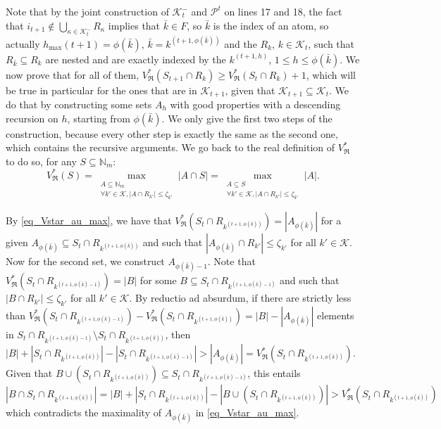 \documentclass[
  11pt,
  a4paper,
]{article}
\theoremstyle{plain}
\theoremstyle{definition}
\theoremstyle{plain}
\theoremstyle{definition}
\theoremstyle{plain}
\theoremstyle{remark}
\begin{document}
Note that by the joint construction of \(\mathcal{K}^-_t\) and
\(\mathcal{P}^t\) on lines 17 and 18, the fact that
\(i_{t+1}\not\in\bigcup_{\kappa\in\mathcal{K}^-_{t}}R_{\kappa}\) implies
that \(\bar k\in F\), so \(\bar k\) is the index of an atom, so actually
\(h_{\max}(t+1)=\phi(\bar k)\), \(\bar k = k^{(t+1,\phi(\bar k))}\) and
the \(R_k\), \(k\in\mathcal{K}_{t}\), such that
\(R_{\bar k}\subseteq R_k\) are nested and are exactly indexed by the
\(k^{(t+1,h)}\), \(1\leq h\leq \phi(\bar k)\). We now prove that for all
of them,
\(V^*_{\mathfrak{R}}(S_{t+1}\cap R_k)\geq V^*_{\mathfrak{R}}(S_{t}\cap R_k)+1\),
which will be true in particular for the ones that are in
\(\mathcal{K}_{t+1}\), given that
\(\mathcal{K}_{t+1}\subseteq \mathcal{K}_t\). We do that by constructing
some sets \(A_h\) with good properties with a descending recursion on
\(h\), starting from \(\phi(\bar k)\). We only give the first two steps
of the construction, because every other step is exactly the same as the
second one, which contains the recursive arguments. We go back to the
real definition of \(V^*_{\mathfrak{R}}\) to do so, for any
\(S\subseteq \mathbb{N}_m\): \begin{equation}
\label{eq_Vstar_au_max} V^*_{\mathfrak{R}}(S)=\max_{\substack{A\subseteq \mathbb{N}_m\\\forall k'\in\mathcal{K}, |A\cap R_{k'}|\leq \zeta_{k'}}} |A\cap S| =\max_{\substack{A\subseteq S\\\forall k'\in\mathcal{K}, |A\cap R_{k'}|\leq \zeta_{k'}}} |A|  . 
\end{equation}

By \eqref{eq_Vstar_au_max}, we have that
\(V^*_{\mathfrak{R}}(S_t \cap R_{k^{(t+1,\phi(\bar k))}})=|A_{\phi(\bar k)}|\)
for a given
\(A_{\phi(\bar k)}\subseteq S_t \cap R_{k^{(t+1,\phi(\bar k))}}\) and
such that \(|A_{\phi(\bar k)}\cap R_{k'}|\leq \zeta_{k'}\) for all
\(k'\in\mathcal{K}\). Now for the second set, we construct
\(A_{\phi(\bar k)-1}\). Note that
\(V^*_{\mathfrak{R}}(S_t \cap R_{k^{(t+1,\phi(\bar k)-1)}})=|B|\) for
some \(B\subseteq S_t \cap R_{k^{(t+1,\phi(\bar k)-1)}}\) and such that
\(|B\cap R_{k'}|\leq \zeta_{k'}\) for all \(k'\in\mathcal{K}\). By
reductio ad absurdum, if there are strictly less than
\(V^*_{\mathfrak{R}}(S_t \cap R_{k^{(t+1,\phi(\bar k)-1)}}) - V^*_{\mathfrak{R}}(S_t \cap R_{k^{(t+1,\phi(\bar k))}})=|B|-|A_{\phi(\bar k)}|\)
elements in
\(S_t\cap R_{k^{(t+1,\phi(\bar k)-1)}} \setminus S_t\cap R_{k^{(t+1,\phi(\bar k))}}\),
then
\(|B|+|S_t \cap R_{k^{(t+1,\phi(\bar k))}}|-|S_t \cap R_{k^{(t+1,\phi(\bar k)-1)}}|>|A_{\phi(\bar k)}|=V^*_{\mathfrak{R}}(S_t \cap R_{k^{(t+1,\phi(\bar k))}})\).
Given that
\(B\cup (S_t\cap R_{k^{(t+1,\phi(\bar k))}})\subseteq S_t \cap R_{k^{(t+1,\phi(\bar k)-1)}}\),
this entails
\(|B\cap S_t\cap R_{k^{(t+1,\phi(\bar k))}}| =|B|+|S_t \cap R_{k^{(t+1,\phi(\bar k))}}| -| B\cup (S_t\cap R_{k^{(t+1,\phi(\bar k))}})| > V^*_{\mathfrak{R}}(S_t \cap R_{k^{(t+1,\phi(\bar k))}})\)
which contradicts the maximality of \(A_{\phi(\bar k)}\) in
\eqref{eq_Vstar_au_max}.
\end{document}
